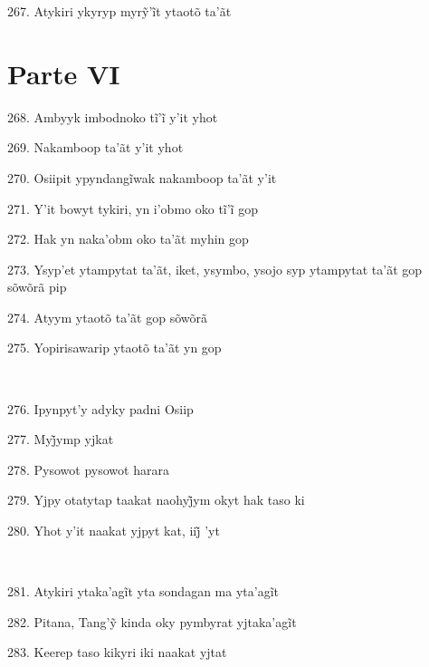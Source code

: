 267. Atykiri ykyryp myrỹ’ĩt ytaotõ ta’ãt

\section{Parte VI}

268. Ambyyk imbodnoko tĩ’ĩ y’it yhot

269. Nakamboop ta'ãt y'it yhot

270. Osiipit ypyndangĩwak nakamboop ta’ãt y’it

271. Y’it bowyt tykiri, yn i’obmo oko tĩ’ĩ gop

272. Hak yn naka'obm oko ta'ãt myhin gop

273. Ysyp'et ytampytat ta'ãt, iket, ysymbo, ysojo syp ytampytat ta'ãt gop sõwõrã pip

274. Atyym ytaotõ ta'ãt gop sõwõrã

275. Yopirisawarip ytaotõ ta'ãt yn gop

~

276. Ipynpyt'y adyky padni Osiip

277. Myj̃ymp yjkat

278. Pysowot pysowot harara

279. Yjpy otatytap taakat naohyj̃ym okyt hak taso ki

280. Yhot y’it naakat yjpyt kat, iij̃ ’yt

~

281. Atykiri ytaka’agĩt yta sondagan ma yta’agĩt

282. Pitana, Tang’ỹ kinda oky pymbyrat yjtaka’agĩt

283. Keerep taso kikyri iki naakat yjtat

\endgroup
